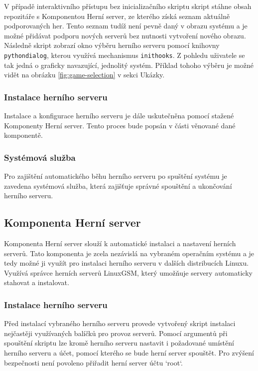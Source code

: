 V případě interaktivního přístupu bez inicializačního skriptu skript stáhne obsah repozitáře s Komponentou Herní server,
ze kterého získá seznam aktuálně podporovaných her. Tento seznam tudíž není pevně daný v obrazu systému a je možné
přidávat podporu nových serverů bez nutnosti vytvoření nového obrazu.
Následně skript zobrazí okno výběru herního serveru pomocí knihovny \texttt{pythondialog}, kterou využívá mechanismus
\texttt{inithooks}. Z pohledu uživatele se tak jedná o graficky navazující, jednolitý systém. Příklad tohoho výběru
je možné vidět na obrázku \ref{fig:game-selection} v sekci Ukázky.

\subsubsection{Instalace herního serveru}

Instalace a konfigurace herního serveru je dále uskutečněna pomocí stažené Komponenty Herní server. Tento proces bude popsán v části věnované dané komponentě.

\subsubsection{Systémová služba}

Pro zajištění automatického běhu herního serveru po spuštění systému je zavedena systémová služba, která zajišťuje správné spouštění
a ukončování herního serveru.

\subsection{Komponenta Herní server}

Komponenta Herní server slouží k automatické instalaci a nastavení herních serverů. Tato komponenta je zcela nezávislá na
vybraném operačním systému a je tedy možné ji využít pro instalaci herního serveru v dalších distribucích Linuxu.
Využívá správce herních serverů LinuxGSM, který umožňuje servery automaticky stahovat a instalovat.

\subsubsection{Instalace herního serveru}

Před instalací vybraného herního serveru provede vytvořený skript instalaci nejčastěji využívaných balíčků pro provoz serverů.
Pomocí argumentů při spouštění skriptu lze kromě herního serveru nastavit i požadované umístění herního serveru a účet, pomocí kterého
se bude herní server spouštět. Pro zvýšení bezpečnosti není povoleno přiřadit herní server účtu `root`.

